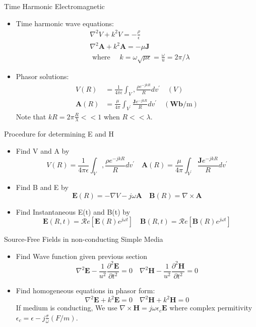 \documentclass[xcolor={dvipsnames}]{beamer}
\begin{document}
\begin{frame}{Time Harmonic Electromagnetic}
\begin{itemize}
	\item Time harmonic wave equations:
	$$
\begin{aligned}
&\nabla^{2} V+k^{2} V=-\frac{\rho}{\epsilon} \\
&\nabla^{2} \mathbf{A}+k^{2} \mathbf{A}=-\mu \mathbf{J} \\
&\text { where } \quad k=\omega \sqrt{\mu \epsilon}=\frac{\omega}{u}=2 \pi / \lambda
\end{aligned}
$$
\item Phasor solutions:
$$
\begin{aligned}
V(R) &=\frac{1}{4 \pi \epsilon} \int_{V}, \frac{\rho e^{-j k R}}{R} d v^{\prime} \quad(V) \\
\mathbf{A}(R) &=\frac{\mu}{4 \pi} \int_{V^{\prime}} \frac{\mathbf{J} e^{-j k R}}{R} d v^{\prime} \quad(\mathbf{W b} / \mathrm{m})
\end{aligned}
$$
Note that $k R=2 \pi \frac{R}{\lambda}<<1$ when $R<<\lambda$.
\end{itemize}
\end{frame}
\begin{frame}{Procedure for determining E and H}
\begin{itemize}
	\item Find V and A by
	$$
V(R)=\frac{1}{4 \pi \epsilon} \int_{V}, \frac{\rho e^{-j k R}}{R} d v^{\prime} \quad \mathbf{A}(R)=\frac{\mu}{4 \pi} \int_{V^{\prime}} \frac{\mathbf{J} e^{-j k R}}{R} d v^{\prime}
$$
\item Find B and E by
$$
\mathbf{E}(R)=-\nabla V-j \omega \mathbf{A} \quad \mathbf{B}(R)=\nabla \times \mathbf{A}
$$
\item Find Instantaneous E(t) and B(t) by
$$
\mathbf{E}(R, t)=\mathcal{R} e\left[\mathbf{E}(R) e^{j \omega t}\right] \quad \mathbf{B}(R, t)=\mathcal{R} e\left[\mathbf{B}(R) e^{j \omega t}\right]
$$
\end{itemize}
\end{frame}
\begin{frame}{Source-Free Fields in non-conducting Simple Media}
\begin{itemize}
	\item Find Wave function given previous section
	$$
\nabla^{2} \mathbf{E}-\frac{1}{u^{2}} \frac{\partial^{2} \mathbf{E}}{\partial t^{2}}=0 \quad \nabla^{2} \mathbf{H}-\frac{1}{u^{2}} \frac{\partial^{2} \mathbf{H}}{\partial t^{2}}=0
$$
\item Find homogeneous equations in phasor form:
$$
\nabla^{2} \mathbf{E}+k^{2} \mathbf{E}=0 \quad \nabla^{2} \mathbf{H}+k^{2} \mathbf{H}=0
$$
If medium is conducting, We use $\nabla \times \mathbf{H}=j \omega \epsilon_{c} \mathbf{E}$ where complex permitivity $\epsilon_{c}=\epsilon-j \frac{\sigma}{\omega}(F / m)$.
\end{itemize}

\end{frame}
\end{document}
